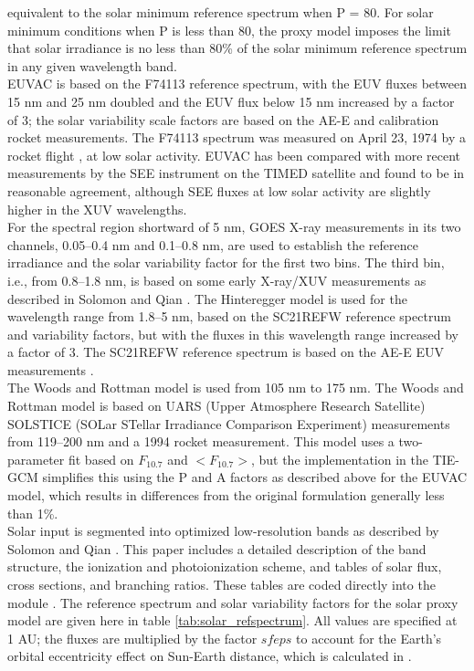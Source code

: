 equivalent to the solar minimum reference spectrum when P = 80. For solar 
minimum conditions when P is less than 80, the proxy model imposes the limit 
that solar irradiance is no less than 80\% of the solar minimum reference 
spectrum in any given wavelength band.\\
%
EUVAC is based on the F74113 reference spectrum, with the EUV fluxes between 
15 nm and 25 nm doubled and the EUV flux below 15 nm increased by a factor of 
3; the solar variability scale factors are based on the AE-E and calibration 
rocket measurements. The F74113 spectrum was measured on April 23, 1974 by a 
rocket flight \cite{Heroux1977},\cite{Heroux1978} at low 
solar activity.       EUVAC has been compared with more recent measurements by 
the SEE instrument on the TIMED satellite \cite{Woods2005} and found to be 
in reasonable agreement, although SEE fluxes at low solar activity are slightly 
higher in the XUV wavelengths. \\
%
For the spectral region shortward of 5 nm, GOES X-ray measurements in its two 
channels, 0.05--0.4 nm and 0.1--0.8 nm, are used to establish the reference 
irradiance and the solar variability factor for the first two bins. The third 
bin, i.e., from 0.8--1.8 nm, is based on some early X-ray/XUV measurements as 
described in Solomon and Qian \cite{Solomon2005}.  The Hinteregger model \cite{Hinteregger1981a} 
is used for the wavelength range from 1.8--5 nm, based on the 
SC21REFW reference spectrum and variability factors, but with the fluxes in 
this wavelength range increased by a factor of 3.  The SC21REFW reference 
spectrum is based on the AE-E EUV measurements \cite{Hinteregger1981b}. \\
%
The Woods and Rottman model \cite{Woods2002} is used from 105 nm to 
175 nm. The Woods and Rottman model is based on UARS (Upper Atmosphere Research 
Satellite) SOLSTICE (SOLar STellar Irradiance Comparison Experiment) measurements 
from 119--200 nm and a 1994 rocket measurement.  This model uses a two-parameter 
fit based on $F_{10.7}$ and $<F_{10.7}>$, but the implementation in the TIE-GCM simplifies 
this using the P and A factors as described above for the EUVAC model, which 
results in differences from the original formulation generally less than 1\%. \\
%
Solar input is segmented into optimized low-resolution bands as described by 
Solomon and Qian \cite{Solomon2005}.  This paper includes a detailed description of the 
band structure, the ionization and photoionization scheme, and tables of solar 
flux, cross sections, and branching ratios.  These tables are coded directly 
into the module .  The reference spectrum and solar variability factors 
for the solar proxy model are given here in table \ref{tab:solar_refspectrum}.  
All values are specified at 1 AU; 
the fluxes are multiplied by the factor $sfeps$ to account for the Earth's 
orbital eccentricity effect on Sun-Earth distance, which is calculated 
in .\\

